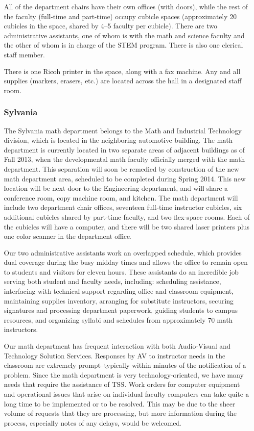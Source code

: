 All of the department chairs have their own offices (with doors), while the
rest of the faculty (full-time and part-time) occupy cubicle spaces
(approximately 20 cubicles in the space, shared by 4--5 faculty per cubicle).
There are two administrative assistants, one of whom is with the math and
science faculty and the other of whom is in charge of the STEM program.  There
is also one clerical staff member.

There is one Ricoh printer in the space, along with a fax machine.  Any and all
supplies (markers, erasers, etc.) are located across the hall in a designated
staff room.

\subsubsection{Sylvania}
The Sylvania math department belongs to the Math and Industrial Technology
division, which is located in the neighboring automotive building.  The math
department is currently located in two separate areas of adjacent buildings as
of Fall 2013, when the developmental math faculty officially merged with the
math department.  This separation will soon be remedied by construction of the
new math department area, scheduled to be completed during Spring 2014.  This
new location will be next door to the Engineering department, and will share a
conference room, copy machine room, and kitchen. The math department will
include two department chair offices, seventeen full-time instructor cubicles,
six additional cubicles shared by part-time faculty, and two flex-space rooms.
Each of the cubicles will have a computer, and there will be two shared laser
printers plus one color scanner in the department office.

 Our two administrative assistants work an overlapped schedule, which provides
 dual coverage during the busy midday times and allows the office to remain
 open to students and visitors for eleven hours.  These assistants do an
 incredible job serving both student and faculty needs, including:  scheduling
 assistance, interfacing with technical support regarding office and classroom
 equipment, maintaining supplies inventory, arranging for substitute
 instructors, securing signatures and processing department paperwork, guiding
 students to campus resources, and organizing syllabi and schedules from
 approximately 70 math instructors.  

Our math department has frequent interaction with both Audio-Visual and
Technology Solution Services.  Responses by AV to instructor needs in the
classroom are extremely prompt--typically within minutes of the notification of
a problem.  Since the math department is very technology-oriented, we have many
needs that require the assistance of TSS.  Work orders for computer equipment
and operational issues that arise on individual faculty computers can take
quite a long time to be implemented or to be resolved.  This may be due to the
sheer volume of requests that they are processing, but more information during
the process, especially notes of any delays, would be welcomed.

